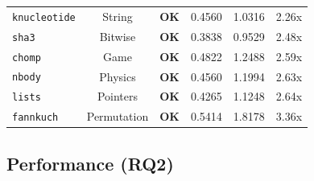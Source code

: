 \documentclass{llncs} %
\begin{document}
\begin{table}[!ht]
{\begin{tabular}{|l|c|c|c|c|r|}
\texttt{knucleotide} & String        & \textbf{OK} & 0.4560 & 1.0316 & 2.26x \\
\texttt{sha3}        & Bitwise       & \textbf{OK} & 0.3838 & 0.9529 & 2.48x \\
\texttt{chomp}       & Game          & \textbf{OK} & 0.4822 & 1.2488 & 2.59x \\
\texttt{nbody}       & Physics       & \textbf{OK} & 0.4560 & 1.1994 & 2.63x \\
\texttt{lists}       & Pointers      & \textbf{OK} & 0.4265 & 1.1248 & 2.64x \\
\texttt{fannkuch}    & Permutation   & \textbf{OK} & 0.5414 & 1.8178 & 3.36x \\
\hline
\end{tabular}%
}
\end{table}

\subsection{Performance (RQ2)}
\end{document}
